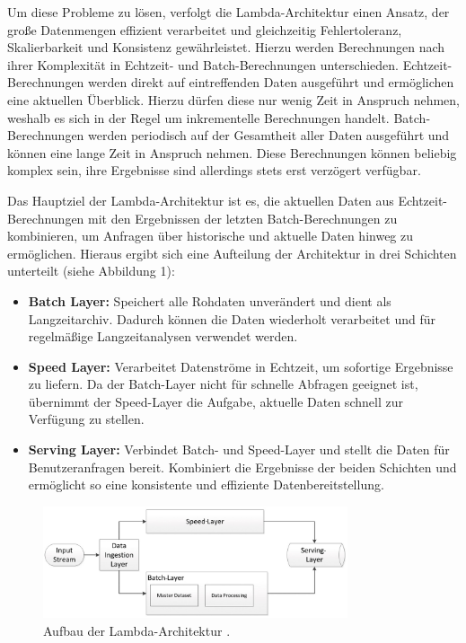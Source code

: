 Um diese Probleme zu lösen, verfolgt die Lambda-Architektur einen Ansatz, der große Datenmengen effizient verarbeitet und gleichzeitig Fehlertoleranz, Skalierbarkeit und Konsistenz gewährleistet.
Hierzu werden Berechnungen nach ihrer Komplexität in Echtzeit- und Batch-Berechnungen unterschieden.
Echtzeit-Berechnungen werden direkt auf eintreffenden Daten ausgeführt und ermöglichen eine aktuellen Überblick.
Hierzu dürfen diese nur wenig Zeit in Anspruch nehmen, weshalb es sich in der Regel um inkrementelle Berechnungen handelt.
Batch-Berechnungen werden periodisch auf der Gesamtheit aller Daten ausgeführt und können eine lange Zeit in Anspruch nehmen.
Diese Berechnungen können beliebig komplex sein, ihre Ergebnisse sind allerdings stets erst verzögert verfügbar.

Das Hauptziel der Lambda-Architektur ist es, 
die aktuellen Daten aus Echtzeit-Berechnungen mit den Ergebnissen der letzten Batch-Berechnungen zu kombinieren,
um Anfragen über historische und aktuelle Daten hinweg zu ermöglichen.
Hieraus ergibt sich eine Aufteilung der Architektur in drei Schichten unterteilt (siehe Abbildung 1):

\begin{itemize}
	\item \textbf{Batch Layer:} Speichert alle Rohdaten unverändert und dient als Langzeitarchiv. Dadurch können die Daten wiederholt verarbeitet und für regelmäßige Langzeitanalysen verwendet werden.
	\item \textbf{Speed Layer:} Verarbeitet Datenströme in Echtzeit, um sofortige Ergebnisse zu liefern. Da der Batch-Layer nicht für schnelle Abfragen geeignet ist, übernimmt der Speed-Layer die Aufgabe, aktuelle Daten schnell zur Verfügung zu stellen.
	\item \textbf{Serving Layer:} Verbindet Batch- und Speed-Layer und stellt die Daten für Benutzeranfragen bereit. Kombiniert die Ergebnisse der beiden Schichten und ermöglicht so eine konsistente und effiziente Datenbereitstellung.
\end{itemize}


\begin{figure}[h] %
    \centering
    \includegraphics[width=0.8\textwidth]{Graphics/Lambda_Architecture.png} %
    \caption{Aufbau der Lambda-Architektur \cite{entwickler_lambda_kappa}.}
    \label{fig:beispielbild}
\end{figure}

